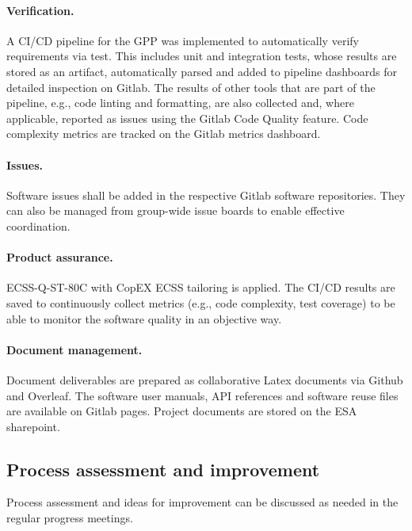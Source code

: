 \paragraph*{Verification.} A CI/CD pipeline for the GPP was implemented to automatically verify requirements via test. This includes unit and integration tests, whose results are stored as an artifact, automatically parsed and added to pipeline dashboards for detailed inspection on Gitlab. The results of other tools that are part of the pipeline, e.g., code linting and formatting, are also collected and, where applicable, reported as issues using the Gitlab Code Quality feature. Code complexity metrics are tracked on the Gitlab metrics dashboard.

\paragraph*{Issues.} Software issues shall be added in the respective Gitlab software repositories. They can also be managed from group-wide issue boards to enable effective coordination.

\paragraph*{Product assurance.} ECSS-Q-ST-80C with CopEX ECSS tailoring is applied. The CI/CD results are saved to continuously collect metrics (e.g., code complexity, test coverage) to be able to monitor the software quality in an objective way.
    
\paragraph*{Document management.} Document deliverables are prepared as collaborative Latex documents via Github and Overleaf. The software user manuals, API references and software reuse files are available on Gitlab pages. Project documents are stored on the ESA sharepoint.
    

\subsection{Process assessment and improvement}


Process assessment and ideas for improvement can be discussed as needed in the regular progress meetings.

